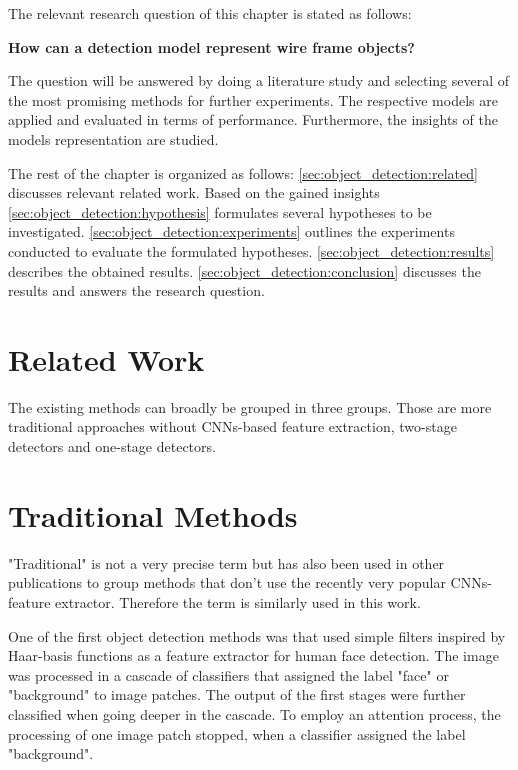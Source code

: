 	The relevant research question of this chapter is stated as follows:
	
	\begin{center}
		\textbf{ How can a detection model represent wire frame objects?}
	\end{center}

	The question will be answered by doing a literature study and selecting several of the most promising methods for further experiments. The respective models are applied and evaluated in terms of performance. Furthermore, the insights of the models representation are studied.

	The rest of the chapter is organized as follows: \autoref{sec:object_detection:related} discusses relevant related work. Based on the gained insights \autoref{sec:object_detection:hypothesis} formulates several hypotheses to be investigated. \autoref{sec:object_detection:experiments} outlines the experiments conducted to evaluate the formulated hypotheses. \autoref{sec:object_detection:results} describes the obtained results. \autoref{sec:object_detection:conclusion} discusses the results and answers the research question.


	\section{Related Work}
	\label{sec:object_detection:related}
	The existing methods can broadly be grouped in three groups. Those are more traditional approaches without \acp{CNN}-based feature extraction, two-stage detectors and one-stage detectors.
	
	\section{Traditional Methods}
	
	"Traditional" is not a very precise term but has also been used in other publications to  group methods that don't use the recently very popular \acp{CNN}-feature extractor. Therefore the term is similarly used in this work.
	
	One of the first object detection methods was \cite{Viola2004} that used simple filters inspired by Haar-basis functions as a feature extractor for human face detection. The image was processed in a cascade of classifiers that assigned the label "face" or "background" to image patches. The output of the first stages were further classified when going deeper in the cascade. To employ an attention process, the processing of one image patch stopped, when a classifier assigned the label "background".
	
